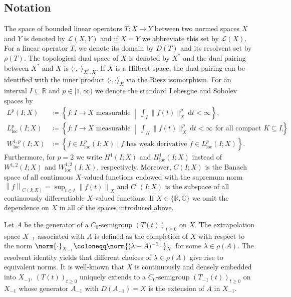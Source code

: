 \documentclass{cocv}
\renewcommand{\d}{\,\mathrm{d}}
\newcommand{\nm}[2][]{\left\lVert #2 \right\rVert_{#1}}
\newcommand{\RR}{\mathbb R}
\newcommand{\CC}{\mathbb C}
\DeclareMathOperator{\loc}{loc}
\theoremstyle{definition}
\begin{document}
\subsection*{Notation}

The space of bounded linear operators $T:X\rightarrow Y$ between two normed spaces $X$ and $Y$ is denoted by $\mathcal{L}(X,Y)$ and if $X=Y$ we abbreviate this set by $\mathcal{L}(X)$. For a linear operator $T$, we denote its domain by $D(T)$ and its resolvent set by $\rho(T)$. The topological dual space of $X$ is denoted by $X^*$ and the dual pairing between $X^*$ and $X$ is $\langle \cdot, \cdot \rangle_{X^*,X}$. If $X$ is a Hilbert space, the dual pairing can be identified with the inner product $\langle \cdot , \cdot \rangle_X$ via the Riesz isomorphism. 
For an interval $I\subseteq \RR$ and $p \in [1,\infty)$ we denote the standard Lebesgue and Sobolev spaces by
\begin{align*}
L^p(I;X) &\coloneqq \left\{f: I \to X \text{ measurable }\middle|\, \int_I  \|f(t)\|_X^p \d t < \infty \right\},\\
L^p_{\loc}(I;X) &\coloneqq \left\{f: I \to X \text{ measurable } \middle|\, \int_K \|f(t)\|_X^p \d t < \infty \text{ for all compact }K \subseteq I\right\},\\
W^{1,p}_{\loc}(I;X) &\coloneqq \left\{f \in L^p_{\loc}(I;X) \mid f \text{ has weak derivative } \dot f \in L^p_{\loc}(I;X) \right\}.
\end{align*}
Furthermore, for $p=2$ we write $H^1(I;X)$ and $H_{\loc}^1(I;X)$ instead of $W^{1,2}(I;X)$ and $W^{1,2}_{\loc}(I;X)$, respectively. 
Moreover, $C(I;X)$ is the Banach space of all continuous $X$-valued functions endowed with the supremum norm 
   $ \nm[{C(I;X)}]{f}= \sup_{t\in I} \nm[X]{f(t)}$ 
and $C^1(I;X)$ is the subspace of all continuously differentiable $X$-valued functions. If $X\in \{\RR,\CC\}$ we omit the dependence on $X$ in all of the spaces introduced above.

Let $A$ be the generator of a $C_0$-semigroup $(T(t))_{t \geq 0}$ on $X$. The extrapolation space $X_{-1}$ associated with $A$ is defined as the completion of $X$ with respect to the norm $\norm{ \cdot }_{X_{-1}} \coloneqq \norm{(\lambda - A)^{-1} \,\cdot\, }_X$ for some $\lambda \in \rho(A)$. The resolvent identity yields that different choices of $\lambda \in \rho(A)$ give rise to equivalent norms. It is well-known that $X$ is continuously and densely embedded into $X_{-1}$, $(T(t))_{t \geq 0}$ uniquely extends to a $C_0$-semigroup $(T_{-1}(t))_{t \geq 0}$ on $X_{-1}$ whose generator $A_{-1}$ with $D(A_{-1})=X$ is the extension of $A$ in $X_{-1}$.
\end{document}
